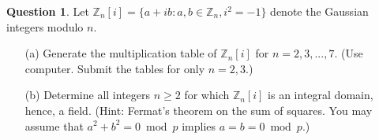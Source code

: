 \documentclass[11pt]{amsart}
\theoremstyle{definition}\newtheorem{question}{Question}
\theoremstyle{definition}\newtheorem{claim}{Claim}
\theoremstyle{remark}\newtheorem*{solution}{Solution}
\newcommand{\Z}{\mathbb{Z}}
\begin{document}
\newpage

\begin{question}
    Let $\Z_n[i] = \{a + ib : a, b \in \Z_n, i^2 = -1\}$ denote the Gaussian integers modulo $n$.
    \begin{itemize}
        \item[(a)] Generate the multiplication table of $\Z_n[i]$ for $n = 2, 3, ..., 7$. (Use computer. Submit the tables for only $n = 2, 3$.)
        \item[(b)] Determine all integers $n \geq 2$ for which $\Z_n[i]$ is an integral domain, hence, a field. (Hint: Fermat's theorem on the sum of squares. You may assume that $a^2 + b^2 = 0 \bmod p$ implies $a = b = 0 \bmod p$.)
    \end{itemize}
\end{question}
\end{document}
